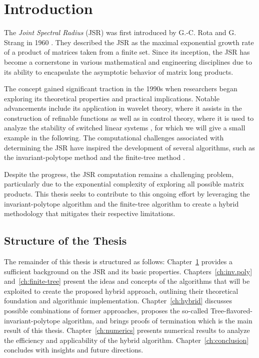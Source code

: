 
\chapter{Introduction}
\label{ch:introduction} %

The \textit{Joint Spectral Radius} (JSR) was first introduced by G.-C. Rota and G. Strang in 1960 \citep{rotaNoteJointSpectral1960}. They described the JSR as the maximal exponential growth rate of a product of matrices taken from a finite set. Since its inception, the JSR has become a cornerstone in various mathematical and engineering disciplines due to its ability to encapsulate the asymptotic behavior of matrix long products. 

The concept gained significant traction in the 1990s when researchers began exploring its theoretical properties and practical implications. Notable advancements include its application in wavelet theory, where it assists in the construction of refinable functions \citep{daubechies1992sets} as well as in control theory, where it is used to analyze the stability of switched linear systems \citep{blondelSurveyComputationalComplexity2000}, for which we will give a small example in the following. The computational challenges associated with determining the JSR have inspired the development of several algorithms, such as the invariant-polytope method \citep{guglielmiExactComputationJoint2013} and the finite-tree method \citep{mollerTreebasedApproachJoint2014}.

Despite the progress, the JSR computation remains a challenging problem, particularly due to the exponential complexity of exploring all possible matrix products. This thesis seeks to contribute to this ongoing effort by leveraging the invariant-polytope algorithm and the finite-tree algorithm to create a hybrid methodology that mitigates their respective limitations.

\section*{Structure of the Thesis}
The remainder of this thesis is structured as follows: Chapter~\ref{ch:introduction} provides a sufficient background on the JSR and its basic properties. Chapters~\ref{ch:inv.poly} and~\ref{ch:finite-tree} present the ideas and concepts of the algorithms that will be exploited to create the proposed hybrid approach, outlining their theoretical foundation and algorithmic implementation. Chapter~\ref{ch:hybrid} discusses possible combinations of former approaches, proposes the so-called Tree-flavored-invariant-polytope algorithm, and brings proofs of termination which is the main result of this thesis. Chapter~\ref{ch:numerics} presents numerical results to analyze the efficiency and applicability of the hybrid algorithm. Chapter~\ref{ch:conclusion} concludes with insights and future directions.

